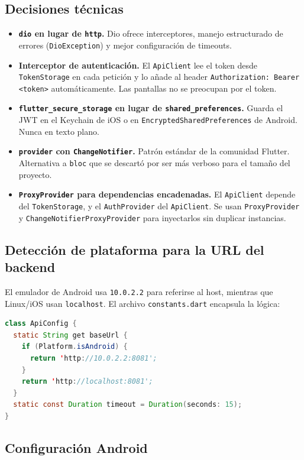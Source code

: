 \subsection{Decisiones técnicas}

\begin{itemize}[leftmargin=*]
  \item \textbf{\texttt{dio} en lugar de \texttt{http}.} Dio ofrece interceptores, manejo estructurado de errores (\texttt{DioException}) y mejor configuración de timeouts.
  \item \textbf{Interceptor de autenticación.} El \texttt{ApiClient} lee el token desde \texttt{TokenStorage} en cada petición y lo añade al header \texttt{Authorization: Bearer <token>} automáticamente. Las pantallas no se preocupan por el token.
  \item \textbf{\texttt{flutter\_secure\_storage} en lugar de \texttt{shared\_preferences}.} Guarda el JWT en el Keychain de iOS o en \texttt{EncryptedSharedPreferences} de Android. Nunca en texto plano.
  \item \textbf{\texttt{provider} con \texttt{ChangeNotifier}.} Patrón estándar de la comunidad Flutter. Alternativa a \texttt{bloc} que se descartó por ser más verboso para el tamaño del proyecto.
  \item \textbf{\texttt{ProxyProvider} para dependencias encadenadas.} El \texttt{ApiClient} depende del \texttt{TokenStorage}, y el \texttt{AuthProvider} del \texttt{ApiClient}. Se usan \texttt{ProxyProvider} y \texttt{ChangeNotifierProxyProvider} para inyectarlos sin duplicar instancias.
\end{itemize}

\subsection{Detección de plataforma para la URL del backend}

El emulador de Android usa \texttt{10.0.2.2} para referirse al host, mientras que Linux/iOS usan \texttt{localhost}. El archivo \texttt{constants.dart} encapsula la lógica:

\begin{lstlisting}[language=Java]
class ApiConfig {
  static String get baseUrl {
    if (Platform.isAndroid) {
      return 'http://10.0.2.2:8081';
    }
    return 'http://localhost:8081';
  }
  static const Duration timeout = Duration(seconds: 15);
}
\end{lstlisting}

\subsection{Configuración Android}

